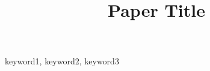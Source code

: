 \documentclass[conference]{IEEEtran}
\title{Paper Title}
\author{
\IEEEauthorblockN{Anonymous Authors}
\IEEEauthorblockA{Anonymous Institution}
}
\begin{document}
\maketitle

\begin{abstract}

\end{abstract}

\begin{IEEEkeywords}
keyword1, keyword2, keyword3
\end{IEEEkeywords}












\appendices

\end{document}
